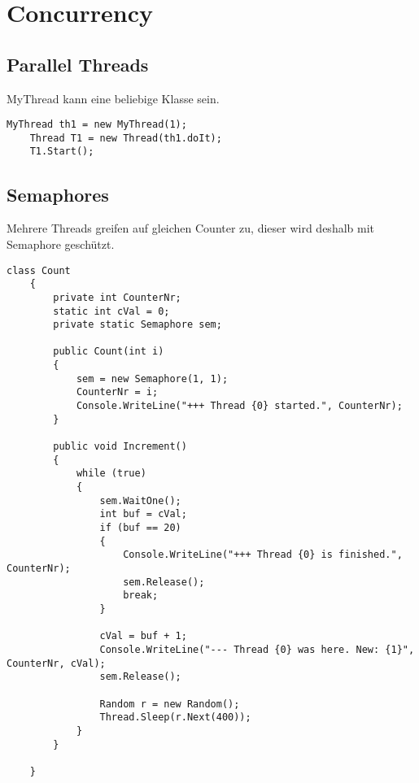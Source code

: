 \newpage
\section{Concurrency}

\subsection{Parallel Threads}
MyThread kann eine beliebige Klasse sein.
\begin{lstlisting}[style=Csharp]
    MyThread th1 = new MyThread(1);
    Thread T1 = new Thread(th1.doIt);
    T1.Start();
\end{lstlisting}

\subsection{Semaphores}
Mehrere Threads greifen auf gleichen Counter zu, dieser wird deshalb mit Semaphore geschützt.
\begin{lstlisting}[style=Csharp]
    class Count
    {
        private int CounterNr;
        static int cVal = 0;
        private static Semaphore sem;

        public Count(int i)
        {
            sem = new Semaphore(1, 1);
            CounterNr = i;
            Console.WriteLine("+++ Thread {0} started.", CounterNr);
        }

        public void Increment()
        {
            while (true)
            {
                sem.WaitOne();
                int buf = cVal;
                if (buf == 20)
                {
                    Console.WriteLine("+++ Thread {0} is finished.", CounterNr);
                    sem.Release();
                    break;
                }

                cVal = buf + 1;
                Console.WriteLine("--- Thread {0} was here. New: {1}", CounterNr, cVal);
                sem.Release();

                Random r = new Random();
                Thread.Sleep(r.Next(400));
            }
        }

    }
\end{lstlisting}